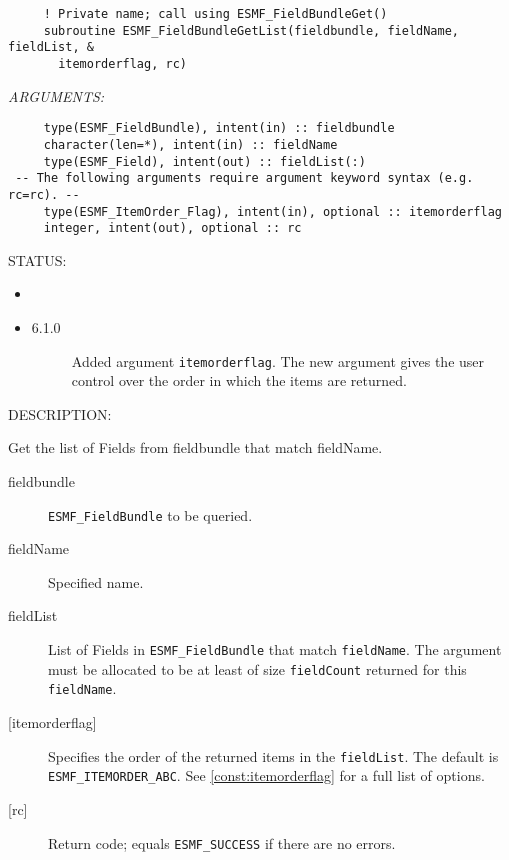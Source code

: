   
\begin{verbatim}     ! Private name; call using ESMF_FieldBundleGet()
     subroutine ESMF_FieldBundleGetList(fieldbundle, fieldName, fieldList, &
       itemorderflag, rc)\end{verbatim}{\em ARGUMENTS:}
\begin{verbatim}     type(ESMF_FieldBundle), intent(in) :: fieldbundle
     character(len=*), intent(in) :: fieldName
     type(ESMF_Field), intent(out) :: fieldList(:)
 -- The following arguments require argument keyword syntax (e.g. rc=rc). --
     type(ESMF_ItemOrder_Flag), intent(in), optional :: itemorderflag
     integer, intent(out), optional :: rc\end{verbatim}
{\sf STATUS:}
   \begin{itemize}
   \item{}
   \item{}
   \begin{description}
   \item[6.1.0] Added argument {\tt itemorderflag}.
   The new argument gives the user control over the order in which
   the items are returned.
   \end{description}
   \end{itemize}
  
{\sf DESCRIPTION:\\ }


   Get the list of Fields from fieldbundle that match fieldName.
  
   \begin{description}
   \item [fieldbundle]
   {\tt ESMF\_FieldBundle} to be queried.
   \item [fieldName]
   Specified name.
   \item [fieldList]
   List of Fields in {\tt ESMF\_FieldBundle} that match {\tt fieldName}. The
   argument must be allocated to be at least of size {\tt fieldCount}
   returned for this {\tt fieldName}.
   \item [{[itemorderflag]}]
   Specifies the order of the returned items in the {\tt fieldList}.
   The default is {\tt ESMF\_ITEMORDER\_ABC}.
   See \ref{const:itemorderflag} for a full list of options.
   \item [{[rc]}]
   Return code; equals {\tt ESMF\_SUCCESS} if there are no errors.
   \end{description}
   
 

